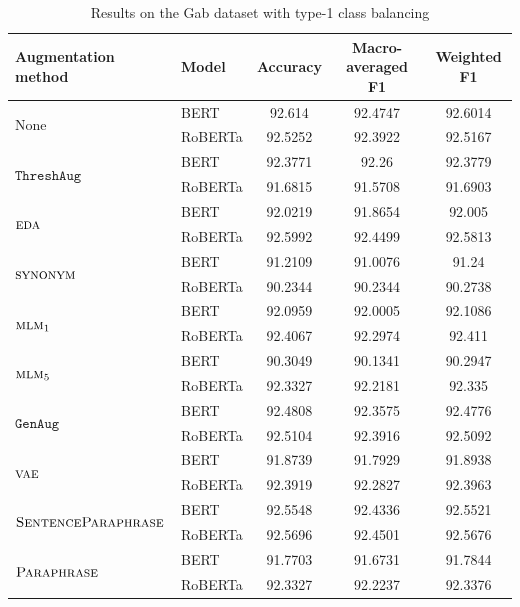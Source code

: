 \documentclass[11pt,a4paper]{article}
\newcommand{\noaug}{$\textrm{None}$}
\newcommand{\senttfpara}{$\textsc{SentenceParaphrase}$}
\newcommand{\tfpara}{$\textsc{Paraphrase}$}
\newcommand{\eda}{$\textsc{eda}$}
\newcommand{\synonym}{$\textsc{synonym}$}
\newcommand{\mlmone}{$\textsc{mlm}_1$}
\newcommand{\mlmfive}{$\textsc{mlm}_5$}
\newcommand{\genaug}{$\texttt{GenAug}$}
\newcommand{\threshaug}{$\texttt{ThreshAug}$}
\newcommand{\vae}{$\textsc{vae}$}
\begin{document}
\begin{table}[]
    \small 
    \centering
    \begin{tabular}{llccc}
        \toprule
        \textbf{Augmentation method} & \textbf{Model} & \textbf{Accuracy} & \textbf{Macro-averaged F1} & \textbf{Weighted F1} \\
        \midrule
        \multirow{2}{*}{\noaug} & BERT & 92.614 & 92.4747 & 92.6014 \\
         & RoBERTa & 92.5252 & 92.3922 & 92.5167 \\\midrule
         
        \multirow{2}{*}{\threshaug} & BERT & 92.3771 & 92.26 & 92.3779 \\
         & RoBERTa & 91.6815 & 91.5708 & 91.6903 \\\cmidrule{2-5}
        \multirow{2}{*}{\eda} & BERT & 92.0219 & 91.8654 & 92.005 \\
         & RoBERTa & 92.5992 & 92.4499 & 92.5813 \\\midrule
    
        \multirow{2}{*}{\synonym} & BERT & 91.2109 & 91.0076 & 91.24 \\
         & RoBERTa & 90.2344 & 90.2344 & 90.2738 \\\cmidrule{2-5}
        \multirow{2}{*}{\mlmone} & BERT & 92.0959 & 92.0005 & 92.1086 \\
         & RoBERTa & 92.4067 & 92.2974 & 92.411 \\\cmidrule{2-5}
        \multirow{2}{*}{\mlmfive} & BERT & 90.3049 & 90.1341 & 90.2947 \\
         & RoBERTa & 92.3327 & 92.2181 & 92.335 \\\midrule
        
         \multirow{2}{*}{\genaug} & BERT & 92.4808 & 92.3575 & 92.4776\\
         & RoBERTa & 92.5104 & 92.3916 & 92.5092 \\\cmidrule{2-5}
        \multirow{2}{*}{\vae} & BERT & 91.8739 & 91.7929 & 91.8938 \\
        & RoBERTa & 92.3919 & 92.2827 & 92.3963 \\\midrule
        
        \multirow{2}{*}{\senttfpara} & BERT & 92.5548 & 92.4336 & 92.5521 \\
         & RoBERTa & 92.5696 & 92.4501 & 92.5676 \\\cmidrule{2-5}
        \multirow{2}{*}{\tfpara} & BERT & 91.7703 & 91.6731 & 91.7844 \\
         & RoBERTa & 92.3327 & 92.2237 & 92.3376 \\
        \bottomrule
    \end{tabular}
    \caption{Results on the Gab dataset with type-1 class balancing}
    \label{tab:gab1}
\end{table}
\end{document}
